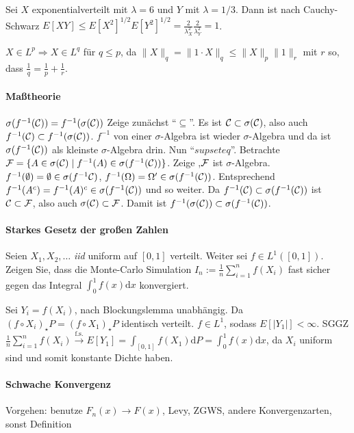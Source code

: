 \documentclass{article}
\begin{document}
Sei $X$ exponentialverteilt mit $\lambda=6$ und $Y$ mit $\lambda=1/3$. Dann ist nach Cauchy-Schwarz $E[XY]\leq E[X^2]^{1/2}E[Y^2]^{1/2}=\frac{2}{\lambda_X^2}\frac{2}{\lambda_Y^2}=1$.

$X\in L^p\Rightarrow X\in L^q$ für $q\leq p$, da $\|X\|_q=\|1\cdot X\|_q\leq\|X\|_p\|1\|_r$ mit $r$ so, dass $\frac{1}{q}=\frac{1}{p}+\frac{1}{r}$.

\paragraph{Maßtheorie}
$\sigma(f^{-1}({\cal C}))=f^{-1}(\sigma({\cal C}))$
Zeige zunächst ``$\subseteq$''.
Es ist ${\cal C}\subset\sigma({\cal C})$, also auch $f^{-1}({\cal C})\subset f^{-1}(\sigma({\cal C}))$.
$f^{-1}$ von einer $\sigma$-Algebra ist wieder $\sigma$-Algebra und da ist $\sigma(f^{-1}({\cal C}))$ als kleinste $\sigma$-Algebra drin.
Nun ``$supseteq$''.
Betrachte ${\cal F}=\{A\in\sigma({\cal C})\mid f^{-1}(A)\in\sigma(f^{-1}({\cal C}))\}$.
Zeige ,${\cal F}$ ist $\sigma$-Algebra.
$f^{-1}(\emptyset)=\emptyset\in\sigma(f^{-1}{\cal C})$, $f^{-1}(\Omega)=\Omega'\in\sigma(f^{-1}({\cal C}))$.
Entsprechend $f^{-1}(A^c)=f^{-1}(A)^c\in\sigma(f^{-1}({\cal C}))$ und so weiter.
Da $f^{-1}({\cal C})\subset\sigma(f^{-1}({\cal C}))$ ist ${\cal C}\subset{\cal F}$, also auch $\sigma({\cal C})\subset{\cal F}$.
Damit ist $f^{-1}(\sigma({\cal C}))\subset\sigma(f^{-1}({\cal C}))$.

\paragraph{Starkes Gesetz der großen Zahlen}
Seien $X_1,X_2,\dots$ \emph{iid} uniform auf $[0,1]$ verteilt.
Weiter sei $f\in L^1([0,1])$.
Zeigen Sie, dass die Monte-Carlo Simulation $\hat{I}_n:=\frac{1}{n}\sum_{i=1}^nf(X_i)$ fast sicher gegen das Integral $\int_0^1f(x)\mathrm{d}x$ konvergiert.

Sei $Y_i=f(X_i)$, nach Blockungslemma unabhängig.
Da $(f\circ X_i)_\star P=(f\circ X_1)_\star P$ identisch verteilt.
$f\in L^1$, sodass $E[|Y_1|]<\infty$.
SGGZ $\frac{1}{n}\sum_{i=1}^nf(X_i)\xrightarrow{\text{f.s.}}E[Y_1]=\int_{[0,1]}f(X_1)\mathrm{d}P=\int_0^1f(x)\mathrm{d}x$, da $X_i$ uniform sind und somit konstante Dichte haben.

\paragraph{Schwache Konvergenz}
Vorgehen: benutze $F_n(x)\to F(x)$, Levy, ZGWS, andere Konvergenzarten, sonst Definition

\end{document}
